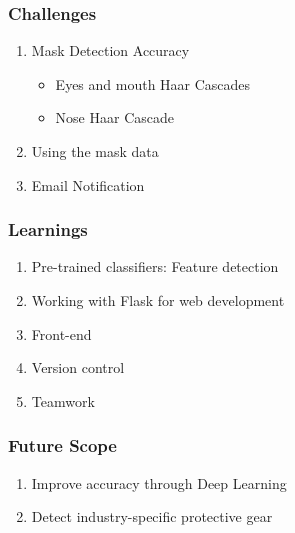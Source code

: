\documentclass[14pt]{beamer}
\begin{document}

\begin{frame}
    \frametitle{Challenges}
    \begin{enumerate}
        \item Mask Detection Accuracy
            \begin{itemize}
            \item Eyes and mouth Haar Cascades
            \item Nose Haar Cascade
            \end{itemize}
        \item Using the mask data
        \item Email Notification 
    \end{enumerate}
\end{frame}


\begin{frame}
    \frametitle{Learnings}
    \begin{enumerate}
        \item Pre-trained classifiers: Feature detection
        \item Working with Flask for web development
        \item Front-end
        \item Version control  
        \item Teamwork
    \end{enumerate}
\end{frame}



\begin{frame}
    \frametitle{Future Scope}
    \begin{enumerate}
        \item Improve accuracy through Deep Learning
        \item Detect industry-specific protective gear
    \end{enumerate}
\end{frame}
\end{document}
